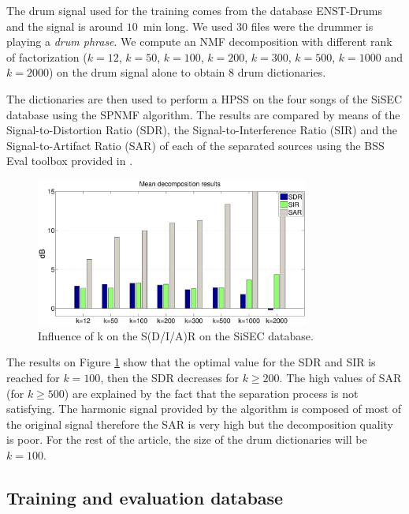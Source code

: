 \documentclass{article}
\begin{document}
The drum signal used for the training comes from the database ENST-Drums \cite{gillet2006enst} and the signal is around $10$~min long. We used $30$ files were the drummer is playing a \emph{drum phrase}. We compute an NMF decomposition with different rank of factorization ($k=12$, $k=50$, $k=100$, $k=200$, $k=300$, $k=500$, $k=1000$ and $k=2000$) on the drum signal alone to obtain $8$ drum dictionaries.

The dictionaries are then used to perform a HPSS on the four songs of the SiSEC database using the SPNMF algorithm. The results are compared by means of the Signal-to-Distortion Ratio (SDR), the Signal-to-Interference Ratio (SIR) and the Signal-to-Artifact Ratio (SAR) of each of the separated sources using the BSS Eval toolbox provided in \cite{bsseval}.

\begin{figure}[h]

  \centering 
  \includegraphics[width=9cm]{figs/AllDictSizeISMIR.eps}
  \caption{\label{dictsize}Influence of k on the S(D/I/A)R on the SiSEC database.}
  
\end{figure}

The results on Figure \ref{dictsize} show that the optimal value for the SDR and SIR is reached for $k=100$, then the SDR decreases for $k\geqslant 200$. The high values of SAR (for $k\geqslant 500$) are explained by the fact that the separation process is not satisfying. The harmonic signal provided by the algorithm is composed of most of the original signal therefore the SAR is very high but the decomposition quality is poor. For the rest of the article, the size of the drum dictionaries will be $k=100$.

\subsection{Training and evaluation database}\label{database}
\end{document}
